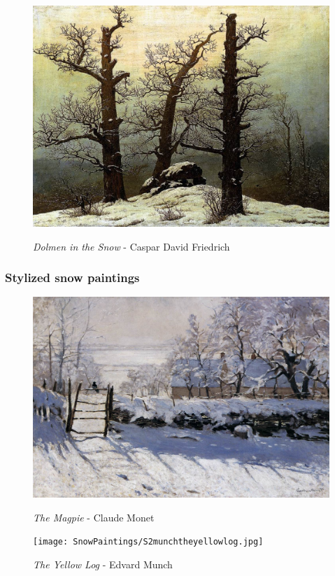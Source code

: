 \documentclass[a4paper]{article}
\begin{document}
\begin {figure}[h!]
\begin{minipage}[b]{.49\textwidth}
	\includegraphics[width=\textwidth]{SnowPaintings/R2friedrichdolmeninthesnow.jpg}
    \caption{\emph{Dolmen in the Snow} - Caspar David Friedrich}
\end{minipage}
\end{figure}

\subsubsection{Stylized snow paintings}
\begin {figure}[h!]
\centering
\begin{minipage}[b]{.49\textwidth}
	\centering
	\includegraphics[width=\textwidth]{SnowPaintings/S1monetthemagpie.jpg}
    \caption{\emph{The Magpie} - Claude Monet}
\end{minipage}
\hfill
\begin{minipage}[b]{.49\textwidth}
	\centering
	\texttt{[image: SnowPaintings/S2munchtheyellowlog.jpg]}
    \caption{\emph{The Yellow Log} - Edvard Munch}
\end{minipage}
\end{figure}
\end{document}
